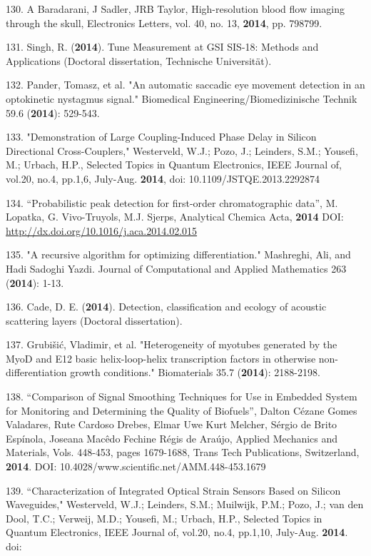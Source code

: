 130. A Baradarani, J Sadler, JRB Taylor, High-resolution blood flow imaging through the skull, Electronics Letters, vol. 40, no. 13, \textbf{2014}, pp. 798\textendash{}799.

131. Singh, R. (\textbf{2014}). Tune Measurement at GSI SIS-18: Methods and Applications (Doctoral dissertation, Technische Universit\"{a}t).

132. Pander, Tomasz, et al. "An automatic saccadic eye movement detection in an optokinetic nystagmus signal." Biomedical Engineering/Biomedizinische Technik 59.6 (\textbf{2014}): 529-543.

133. "Demonstration of Large Coupling-Induced Phase Delay in Silicon Directional Cross-Couplers," Westerveld, W.J.; Pozo, J.; Leinders, S.M.; Yousefi, M.; Urbach, H.P., Selected Topics in Quantum Electronics, IEEE Journal of, vol.20, no.4, pp.1,6, July-Aug. \textbf{2014}, doi: 10.1109/JSTQE.2013.2292874

134. ``Probabilistic peak detection for first-order chromatographic data'', M. Lopatka, G. Vivo-Truyols, M.J. Sjerps, Analytical Chemica Acta, \textbf{2014} DOI: \url{http://dx.doi.org/10.1016/j.aca.2014.02.015}

135. "A recursive algorithm for optimizing differentiation." Mashreghi, Ali, and Hadi Sadoghi Yazdi. Journal of Computational and Applied Mathematics 263 (\textbf{2014}): 1-13.

136. Cade, D. E. (\textbf{2014}). Detection, classification and ecology of acoustic scattering layers (Doctoral dissertation).

137. Grubi\v{s}i\'{c}, Vladimir, et al. "Heterogeneity of myotubes generated by the MyoD and E12 basic helix-loop-helix transcription factors in otherwise non-differentiation growth conditions." Biomaterials 35.7 (\textbf{2014}): 2188-2198.

138. ``Comparison of Signal Smoothing Techniques for Use in Embedded System for Monitoring and Determining the Quality of Biofuels'', Dalton C\'{e}zane Gomes Valadares, Rute Cardoso Drebes, Elmar Uwe Kurt Melcher, S\'{e}rgio de Brito Esp\'{i}nola, Joseana Mac\^{e}do Fechine R\'{e}gis de Ara\'{u}jo, Applied Mechanics and Materials, Vols. 448-453, pages 1679-1688, Trans Tech Publications, Switzerland, \textbf{2014}. DOI: 10.4028/www.scientific.net/AMM.448-453.1679

139. ``Characterization of Integrated Optical Strain Sensors Based on Silicon Waveguides," Westerveld, W.J.; Leinders, S.M.; Muilwijk, P.M.; Pozo, J.; van den Dool, T.C.; Verweij, M.D.; Yousefi, M.; Urbach, H.P., Selected Topics in Quantum Electronics, IEEE Journal of, vol.20, no.4, pp.1,10, July-Aug. \textbf{2014}. doi:


